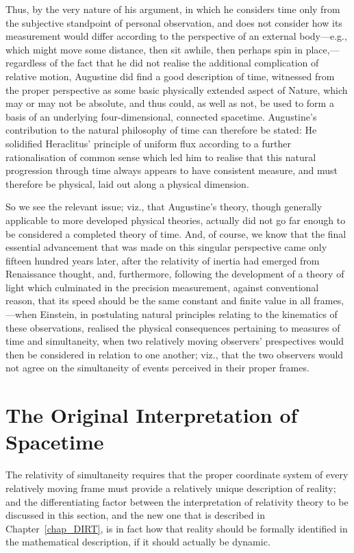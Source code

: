 Thus, by the very nature of his argument, in which he considers time only from the subjective standpoint of personal observation, and does not consider how its measurement would differ according to the perspective of an external body---e.g., which might move some distance, then sit awhile, then perhaps spin in place,---regardless of the fact that he did not realise the additional complication of relative motion, Augustine did find a good description of time, witnessed from the proper perspective as some basic physically extended aspect of Nature, which may or may not be absolute, and thus could, as well as not, be used to form a basis of an underlying four-dimensional, connected spacetime. Augustine's contribution to the natural philosophy of time can therefore be stated: He solidified Heraclitus' principle of uniform flux according to a further rationalisation of common sense which led him to realise that this natural progression through time always appears to have consistent measure, and must therefore be physical, laid out along a physical dimension.

So we see the relevant issue; viz., that Augustine's theory, though generally applicable to more developed physical theories, actually did not go far enough to be considered a completed theory of time. And, of course, we know that the final essential advancement that was made on this singular perspective came only fifteen hundred years later, after the relativity of inertia had emerged from Renaissance thought, and, furthermore, following the development of a theory of light which culminated in the precision measurement, against conventional reason, that its speed should be the same constant and finite value in all frames,---when Einstein, in postulating natural principles relating to the kinematics of these observations, realised the physical consequences pertaining to measures of time and simultaneity, when two relatively moving observers' prespectives would then be considered in relation to one another; viz., that the two observers would not agree on the simultaneity of events perceived in their proper frames. 
\section{The Original Interpretation of Spacetime\label{sec_OIS}}
The relativity of simultaneity requires that the proper coordinate system of every relatively moving frame must provide a relatively unique description of reality; and the differentiating factor between the interpretation of relativity theory to be discussed in this section, and the new one that is described in Chapter~\ref{chap_DIRT}, is in fact how that reality should be formally identified in the mathematical description, if it should actually be dynamic.

